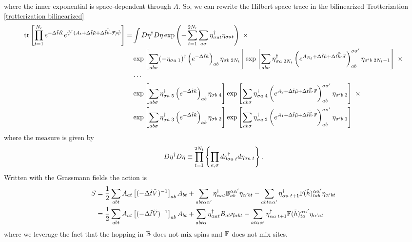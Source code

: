 where the inner exponential is space-dependent through $A$.
So, we can rewrite the Hilbert space trace in the bilinearized Trotterization \eqref{trotterization bilinearized}
\begin{align}
	\text{tr}\left[\prod_{t=1}^{N_t} e^{-\Delta \tilde{t}\tilde{K}}  e^{ \tilde{\psi}{}^{\dagger} (A_t + \Delta\tilde{t} \tilde{\mu} + \Delta\tilde{t} \tilde{\vec{h}}\cdot\vec{\sigma})\tilde{\psi}} \right]
	=& \int D\eta{}^{\dagger} D\eta \exp\left( - \sum_{t=1}^{2N_t}\sum_{a\sigma} \eta{}^{\dagger}_{\sigma a t} \eta_{\sigma a t}\right)~ \times
	\nonumber\\
	&
		\exp\left[ \sum_{ab\sigma} (-\eta_{\sigma a\;1}){}^{\dagger} \left(e^{-\Delta \tilde{t} \tilde{\kappa}}\right)_{ab} \eta_{\sigma b\;2N_t} \right]
		\exp\left[ \sum_{ab\sigma} \eta{}^{\dagger}_{\sigma a\;2N_t} \left(e^{A_{N_t}+\Delta\tilde{t}\tilde{\mu} + \Delta\tilde{t}\tilde{\vec{h}}\cdot\vec{\sigma} }\right)_{ab}^{\sigma\sigma'} \eta_{\sigma' b\;2N_t-1}\right] ~ \times
	\nonumber\\
	&
		\cdots
	\nonumber\\
	&
		\exp\left[ \sum_{ab\sigma} \eta{}^{\dagger}_{\sigma a\;5} \left(e^{-\Delta \tilde{t} \tilde{\kappa}}\right)_{ab} \eta_{\sigma b\;4} \right]
		\exp\left[ \sum_{ab\sigma} \eta{}^{\dagger}_{\sigma a\;4} \left(e^{A_{2}+\Delta\tilde{t}\tilde{\mu} + \Delta\tilde{t}\tilde{\vec{h}}\cdot\vec{\sigma}}\right)_{ab}^{\sigma\sigma'} \eta_{\sigma' b\;3}\right] ~ \times
	\nonumber\\
	&
		\exp\left[ \sum_{ab\sigma} \eta{}^{\dagger}_{\sigma a\;3} \left(e^{-\Delta \tilde{t} \tilde{\kappa}}\right)_{ab} \eta_{\sigma b\;2} \right]
		\exp\left[ \sum_{ab\sigma} \eta{}^{\dagger}_{\sigma a\;2} \left(e^{A_{1}+\Delta\tilde{t}\tilde{\mu} + \Delta\tilde{t}\tilde{\vec{h}}\cdot\vec{\sigma}}\right)_{ab}^{\sigma\sigma'} \eta_{\sigma' b\;1}\right]
\end{align}
where the measure is given by
\begin{equation}
	D\eta{}^{\dagger} D\eta \equiv \prod_{t=1}^{2N_t} \left\{ \prod_{a, \sigma} d \eta^{\dagger}_{\sigma a\; t} d\eta_{\sigma a\; t} \right\}.
\end{equation}
Written with the Grassmann fields the action is
\begin{align}
	S &= 
	\frac{1}{2} \sum_{ab t} A_{at} \left[(-\Delta\tilde{t} \tilde{V})^{-1}\right]_{ab} A_{bt}
+	\sum_{ab t \alpha\alpha'} \eta{}^{\dagger}_{\alpha a t} \mathbb{B}^{\alpha\alpha'}_{ab} \eta_{\alpha' b t}
-	\sum_{ab t \alpha\alpha'}\eta{}^{\dagger}_{\alpha a\; t+1} \mathbb{F}(\tilde{h})^{\alpha\alpha'}_{tab} \eta_{\alpha' b t}
\nonumber\\
	&=
	\frac{1}{2} \sum_{ab t} A_{at} \left[(-\Delta\tilde{t} \tilde{V})^{-1}\right]_{ab} A_{bt}
+	\sum_{ab t \alpha} \eta{}^{\dagger}_{\alpha a t} B_{ab} \eta_{\alpha b t}
-	\sum_{a t \alpha\alpha'}\eta{}^{\dagger}_{\alpha a\; t+1} \mathbb{F}(\tilde{h})^{\alpha\alpha'}_{ta} \eta_{\alpha' a t}
\end{align}
where we leverage the fact that the hopping in $\mathbb{B}$ does not mix spins and $\mathbb{F}$ does not mix sites.

